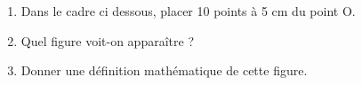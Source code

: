\documentclass[../main.tex]{subfiles}
\begin{document}
\begingroup\small
    \begin{enumerate}[1), font=\bfseries]
        \item Dans le cadre ci dessous, placer 10 points à 5 cm du point O.
        \vspace{10pt}\par\noindent
        \item Quel figure voit-on apparaître ?
        \dotedline
        \item Donner une définition mathématique de cette figure.
        \dotedline
    \end{enumerate}\endgroup
\end{document}
